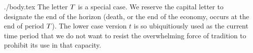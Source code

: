 \message{ !name(Variables-Single-Letter.tex)}\documentclass{econtex}
\begin{document}
\begin{verbatimwrite}{./body.tex}
The letter $T$ is a special case.  We reserve the capital letter to designate the end of 
the horizon (death, or the end of the economy, occurs at the end of period $T$).  The lower case version $t$ is so ubiquitiously
used as the current time period that we do not want to resist the overwhelming force of 
tradition to prohibit its use in that capacity.  

\end{verbatimwrite}

\end{document}
